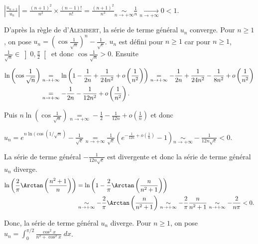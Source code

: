 {{\begin{center}
$\left|\frac{u_{n+1}}{u_n}\right|=\frac{(n+1)^2}{n^2}\times\frac{(n-1)!}{n!}=\frac{(n+1)^2}{n^3}  \underset{n\rightarrow+\infty}{\sim}\frac{1}{n}\underset{n\rightarrow+\infty}{\rightarrow}0< 1$.
\end{center}

D'après la règle de d'\textsc{Alembert}, la série de terme général $u_n$ converge.
Pour $n\geqslant1$, on pose $u_n=\left(\cos\frac{1}{\sqrt{n}}\right)^n-\frac{1}{\sqrt{e}}$. $u_n$ est défini pour $n\geqslant1$ car pour $n\geqslant1$, $\frac{1}{\sqrt{n}}\in\left]0,\frac{\pi}{2}\right[$ et donc $\cos\frac{1}{\sqrt{n}}>0$. Ensuite

\begin{align*}\ensuremath
\ln\left(\cos\frac{1}{\sqrt{n}}\right)&\underset{n\rightarrow+\infty}{=}\ln\left(1-\frac{1}{2n}+\frac{1}{24n^2}+o\left(\frac{1}{n^2}\right)\right)\underset{n\rightarrow+\infty}{=}-\frac{1}{2n}+\frac{1}{24n^2}-\frac{1}{8n^2}+o\left(\frac{1}{n^2}\right)\\
 &\underset{n\rightarrow+\infty}{=}-\frac{1}{2n}-\frac{1}{12n^2}+o\left(\frac{1}{n^2}\right).
\end{align*}

Puis $n\ln\left(\cos\frac{1}{\sqrt{n}}\right)\underset{n\rightarrow+\infty}{=}-\frac{1}{2}-\frac{1}{12n}+o\left(\frac{1}{n}\right)$ et donc

\begin{center}
$u_n=e^{n\ln(\cos(1/\sqrt{n})}-\frac{1}{\sqrt{e}}\underset{n\rightarrow+\infty}{=}\frac{1}{\sqrt{e}}\left(e^{-\frac{1}{12n}+o\left(\frac{1}{n}\right)}-1\right)\underset{n\rightarrow+\infty}{\sim}-\frac{1}{12n\sqrt{e}}<0$.
\end{center}

La série de terme général $-\frac{1}{12n\sqrt{e}}$ est  divergente et donc la série de terme général $u_n$ diverge.
\begin{align*}\ensuremath
\ln\left(\frac{2}{\pi}\Arctan\left(\frac{n^2+1}{n}\right)\right)&=\ln\left(1-\frac{2}{\pi}\Arctan\left(\frac{n}{n^2+1}\right)\right)\\
 &\underset{n\rightarrow+\infty}{\sim}-\frac{2}{\pi}\Arctan\left(\frac{n}{n^2+1}\right)\underset{n\rightarrow+\infty}{\sim}-\frac{2}{\pi}\frac{n}{n^2+1}\underset{n\rightarrow+\infty}{\sim}-\frac{2}{n\pi}<0.
\end{align*}

Donc, la série de terme général $u_n$ diverge.
Pour $n\geqslant1$, on pose $u_n=\int_{0}^{\pi/2}\frac{\cos^2x}{n^2+\cos^2x}\;dx$.

}}
